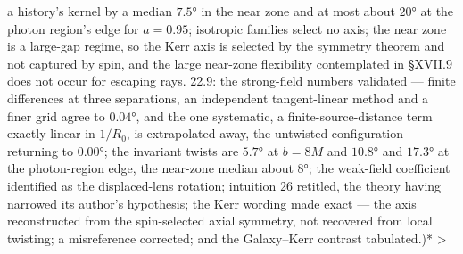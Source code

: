 a history's kernel by a median $7.5°$ in the near zone and at most about $20°$ at the photon region's edge for $a = 0.95$; isotropic families select no axis; the near zone is a large-gap regime, so the Kerr axis is selected by the symmetry theorem and not captured by spin, and the large near-zone flexibility contemplated in §XVII.9 does not occur for escaping rays. 22.9: the strong-field numbers validated — finite differences at three separations, an independent tangent-linear method and a finer grid agree to $0.04°$, and the one systematic, a finite-source-distance term exactly linear in $1/R_0$, is extrapolated away, the untwisted configuration returning to $0.00°$; the invariant twists are $5.7°$ at $b = 8M$ and $10.8°$ and $17.3°$ at the photon-region edge, the near-zone median about $8°$; the weak-field coefficient identified as the displaced-lens rotation; intuition 26 retitled, the theory having narrowed its author's hypothesis; the Kerr wording made exact — the axis reconstructed from the spin-selected axial symmetry, not recovered from local twisting; a misreference corrected; and the Galaxy–Kerr contrast tabulated.)*
>
